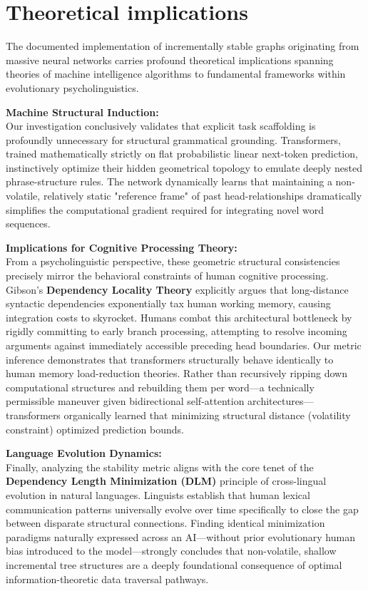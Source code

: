 \documentclass[11pt,a4paper]{article}
\begin{document}
\section{Theoretical implications}

The documented implementation of incrementally stable graphs originating from massive neural networks carries profound theoretical implications spanning theories of machine intelligence algorithms to fundamental frameworks within evolutionary psycholinguistics. 

\textbf{Machine Structural Induction:}\\
Our investigation conclusively validates that explicit task scaffolding is profoundly unnecessary for structural grammatical grounding. Transformers, trained mathematically strictly on flat probabilistic linear next-token prediction, instinctively optimize their hidden geometrical topology to emulate deeply nested phrase-structure rules. The network dynamically learns that maintaining a non-volatile, relatively static "reference frame" of past head-relationships dramatically simplifies the computational gradient required for integrating novel word sequences.

\textbf{Implications for Cognitive Processing Theory:}\\
From a psycholinguistic perspective, these geometric structural consistencies precisely mirror the behavioral constraints of human cognitive processing. Gibson's \textbf{Dependency Locality Theory} explicitly argues that long-distance syntactic dependencies exponentially tax human working memory, causing integration costs to skyrocket. Humans combat this architectural bottleneck by rigidly committing to early branch processing, attempting to resolve incoming arguments against immediately accessible preceding head boundaries. 
Our metric inference demonstrates that transformers structurally behave identically to human memory load-reduction theories. Rather than recursively ripping down computational structures and rebuilding them per word---a technically permissible maneuver given bidirectional self-attention architectures---transformers organically learned that minimizing structural distance (volatility constraint) optimized prediction bounds.

\textbf{Language Evolution Dynamics:}\\
Finally, analyzing the stability metric aligns with the core tenet of the \textbf{Dependency Length Minimization (DLM)} principle of cross-lingual evolution in natural languages. Linguists establish that human lexical communication patterns universally evolve over time specifically to close the gap between disparate structural connections. Finding identical minimization paradigms naturally expressed across an AI---without prior evolutionary human bias introduced to the model---strongly concludes that non-volatile, shallow incremental tree structures are a deeply foundational consequence of optimal information-theoretic data traversal pathways.
\end{document}
